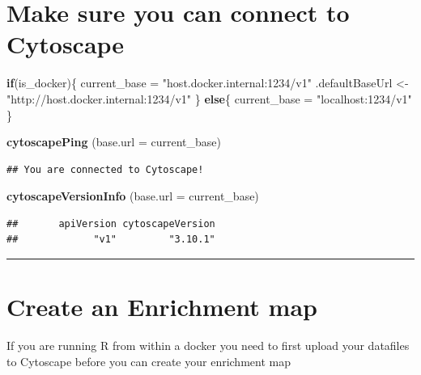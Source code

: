 \documentclass[
]{book}
\newenvironment{Shaded}{\begin{snugshade}}{\end{snugshade}}
\newcommand{\AttributeTok}[1]{\textcolor[rgb]{0.13,0.29,0.53}{#1}}
\newcommand{\ControlFlowTok}[1]{\textcolor[rgb]{0.13,0.29,0.53}{\textbf{#1}}}
\newcommand{\FunctionTok}[1]{\textcolor[rgb]{0.13,0.29,0.53}{\textbf{#1}}}
\newcommand{\NormalTok}[1]{#1}
\newcommand{\OtherTok}[1]{\textcolor[rgb]{0.56,0.35,0.01}{#1}}
\newcommand{\StringTok}[1]{\textcolor[rgb]{0.31,0.60,0.02}{#1}}
\begin{document}
\hypertarget{make-sure-you-can-connect-to-cytoscape}{%
\section{Make sure you can connect to Cytoscape}\label{make-sure-you-can-connect-to-cytoscape}}

\begin{Shaded}
\begin{Highlighting}[]
\ControlFlowTok{if}\NormalTok{(is\_docker)\{}
\NormalTok{  current\_base }\OtherTok{=} \StringTok{"host.docker.internal:1234/v1"}
\NormalTok{  .defaultBaseUrl }\OtherTok{\textless{}{-}} \StringTok{"http://host.docker.internal:1234/v1"}
\NormalTok{\} }\ControlFlowTok{else}\NormalTok{\{}
\NormalTok{  current\_base }\OtherTok{=} \StringTok{"localhost:1234/v1"}
\NormalTok{\}}

\FunctionTok{cytoscapePing}\NormalTok{ (}\AttributeTok{base.url =}\NormalTok{ current\_base)}
\end{Highlighting}
\end{Shaded}

\begin{verbatim}
## You are connected to Cytoscape!
\end{verbatim}

\begin{Shaded}
\begin{Highlighting}[]
\FunctionTok{cytoscapeVersionInfo}\NormalTok{ (}\AttributeTok{base.url =}\NormalTok{ current\_base)}
\end{Highlighting}
\end{Shaded}

\begin{verbatim}
##       apiVersion cytoscapeVersion 
##             "v1"         "3.10.1"
\end{verbatim}

\begin{center}\rule{0.5\linewidth}{0.5pt}\end{center}

\hypertarget{create-an-enrichment-map}{%
\section{Create an Enrichment map}\label{create-an-enrichment-map}}

If you are running R from within a docker you need to first upload your datafiles to Cytoscape before you can create your enrichment map
\end{document}
